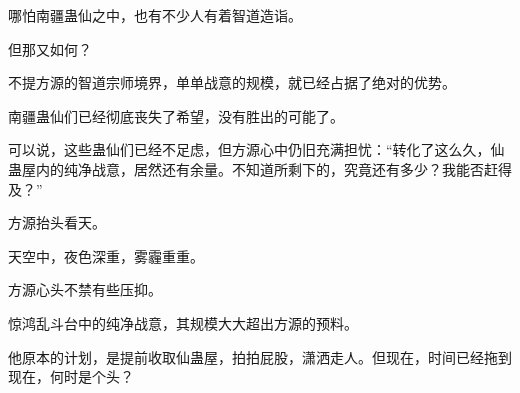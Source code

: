 \begin{this_body}
哪怕南疆蛊仙之中，也有不少人有着智道造诣。

但那又如何？

不提方源的智道宗师境界，单单战意的规模，就已经占据了绝对的优势。

南疆蛊仙们已经彻底丧失了希望，没有胜出的可能了。

可以说，这些蛊仙们已经不足虑，但方源心中仍旧充满担忧：“转化了这么久，仙蛊屋内的纯净战意，居然还有余量。不知道所剩下的，究竟还有多少？我能否赶得及？”

方源抬头看天。

天空中，夜色深重，雾霾重重。

方源心头不禁有些压抑。

惊鸿乱斗台中的纯净战意，其规模大大超出方源的预料。

他原本的计划，是提前收取仙蛊屋，拍拍屁股，潇洒走人。但现在，时间已经拖到现在，何时是个头？

\end{this_body}

